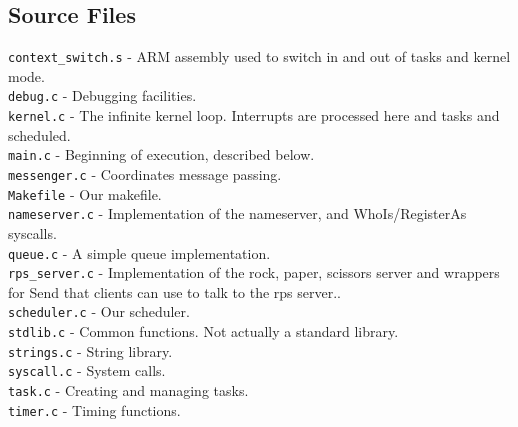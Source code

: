 \documentclass[letterpaper]{article}
\begin{document}
\subsection{Source Files}
\verb!context_switch.s! - ARM assembly used to switch in and out of tasks and kernel mode.\\
\verb!debug.c! - Debugging facilities.\\
\verb!kernel.c! - The infinite kernel loop. Interrupts are processed here and tasks and scheduled.\\
\verb!main.c! - Beginning of execution, described below.\\
\verb!messenger.c! - Coordinates message passing.\\
\verb!Makefile! - Our makefile.\\
\verb!nameserver.c! - Implementation of the nameserver, and WhoIs/RegisterAs syscalls.\\
\verb!queue.c! - A simple queue implementation.\\
\verb!rps_server.c! - Implementation of the rock, paper, scissors server and wrappers for Send that clients can use to talk to the rps server..\\
\verb!scheduler.c! - Our scheduler.\\
\verb!stdlib.c! - Common functions. Not actually a standard library.\\
\verb!strings.c! - String library.\\
\verb!syscall.c! - System calls.\\
\verb!task.c! - Creating and managing tasks.\\
\verb!timer.c! - Timing functions.\\
\end{document}
